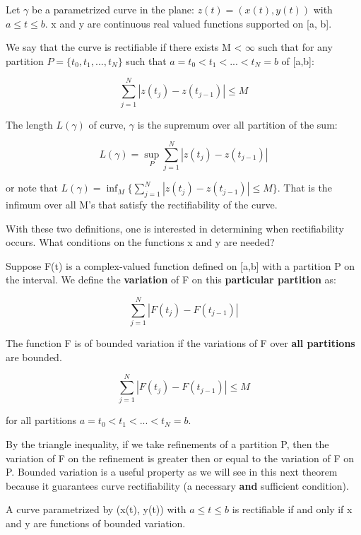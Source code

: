 \documentclass[class=article, crop=false]{standalone}
\begin{document}
			Let $\gamma$ be a parametrized curve in the plane: $z(t) = (x(t), y(t))$ with $a \le t \le b$. x and y are continuous real valued functions supported on [a, b].

			\begin{definition} 
				We say that the curve is rectifiable if there exists M < $\infty$ such that for any partition $P = \{t_0, t_1, ..., t_N\}$ such that $a=t_0 < t_1 < ... < t_N = b$ of [a,b]:

					$$\sum_{j=1}^N |z(t_j) - z(t_{j-1})| \le M$$
			\end{definition}
			\begin{definition} 
				The length $L(\gamma)$ of curve, $\gamma$ is the supremum over all partition of the sum:

					$$L(\gamma) = \sup_P \sum_{j=1}^N |z(t_j) - z(t_{j-1})|$$

				or note that $L(\gamma) = \inf_M \{\sum_{j=1}^N |z(t_j) - z(t_{j-1})| \le M\}$. That is the infimum over all M's that satisfy the rectifiability of the curve.
			\end{definition}

			With these two definitions, one is interested in determining when rectifiability occurs. What conditions on the functions x and y are needed? 

			Suppose F(t) is a complex-valued function defined on [a,b] with a partition P on the interval. We define the \textbf{variation} of F on this \textbf{particular partition} as:

				$$\sum_{j=1}^N |F(t_j) - F(t_{j-1})|$$

			\begin{definition}
				The function F is of bounded variation if the variations of F over \textbf{all partitions} are bounded.

					$$\sum_{j=1}^N |F(t_j) - F(t_{j-1})| \le M$$

				for all partitions $a = t_0 < t_1 < ... < t_N = b$.
			\end{definition}

			By the triangle inequality, if we take refinements of a partition P, then the variation of F on the refinement is greater then or equal to the variation of F on P. Bounded variation is a useful property as we will see in this next theorem because it guarantees curve rectifiability (a necessary \textbf{and} sufficient condition).

			\begin{theorem} 
				A curve parametrized by (x(t), y(t)) with $a \le t \le b$ is rectifiable if and only if x and y are functions of bounded variation.
			\end{theorem}
\end{document}
